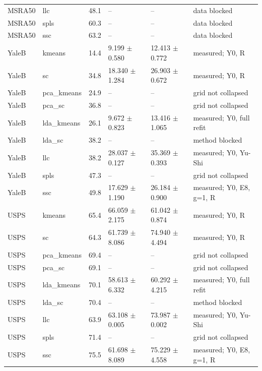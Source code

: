 \begin{longtable}{llrllp{2.9cm}}
MSRA50 & llc & 48.1 & -- & -- & data blocked \\
MSRA50 & spls & 60.3 & -- & -- & data blocked \\
MSRA50 & ssc & 63.2 & -- & -- & data blocked \\
YaleB & kmeans & 14.4 & 9.199 $\pm$ 0.580 & 12.413 $\pm$ 0.772 & measured; Y0, R \\
YaleB & sc & 34.8 & 18.340 $\pm$ 1.284 & 26.903 $\pm$ 0.672 & measured; Y0, R \\
YaleB & pca\_kmeans & 24.9 & -- & -- & grid not collapsed \\
YaleB & pca\_sc & 36.8 & -- & -- & grid not collapsed \\
YaleB & lda\_kmeans & 26.1 & 9.672 $\pm$ 0.823 & 13.416 $\pm$ 1.065 & measured; Y0, full refit \\
YaleB & lda\_sc & 38.2 & -- & -- & method blocked \\
YaleB & llc & 38.2 & 28.037 $\pm$ 0.127 & 35.369 $\pm$ 0.393 & measured; Y0, Yu-Shi \\
YaleB & spls & 47.3 & -- & -- & grid not collapsed \\
YaleB & ssc & 49.8 & 17.629 $\pm$ 1.190 & 26.184 $\pm$ 0.900 & measured; Y0, E8, g=1, R \\
USPS & kmeans & 65.4 & 66.059 $\pm$ 2.175 & 61.042 $\pm$ 0.874 & measured; Y0, R \\
USPS & sc & 64.3 & 61.739 $\pm$ 8.086 & 74.940 $\pm$ 4.494 & measured; Y0, R \\
USPS & pca\_kmeans & 69.4 & -- & -- & grid not collapsed \\
USPS & pca\_sc & 69.1 & -- & -- & grid not collapsed \\
USPS & lda\_kmeans & 70.1 & 58.613 $\pm$ 6.332 & 60.292 $\pm$ 4.215 & measured; Y0, full refit \\
USPS & lda\_sc & 70.4 & -- & -- & method blocked \\
USPS & llc & 63.9 & 63.108 $\pm$ 0.005 & 73.987 $\pm$ 0.002 & measured; Y0, Yu-Shi \\
USPS & spls & 71.4 & -- & -- & grid not collapsed \\
USPS & ssc & 75.5 & 61.698 $\pm$ 8.089 & 75.229 $\pm$ 4.558 & measured; Y0, E8, g=1, R \\
\bottomrule\end{longtable}
\normalsize
